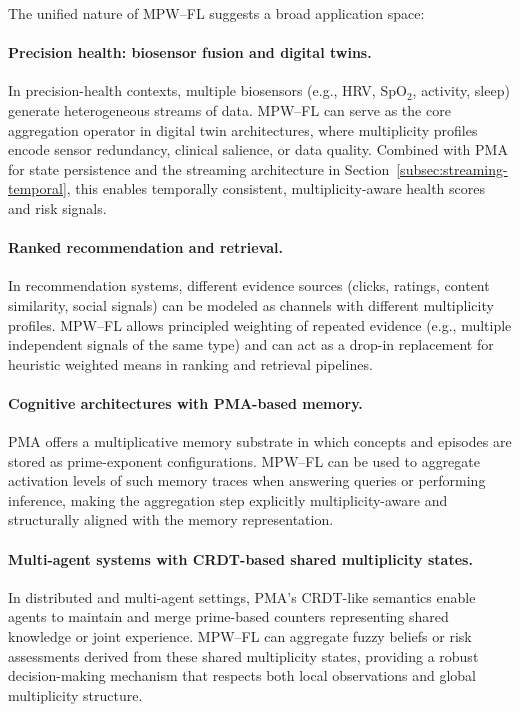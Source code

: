 \documentclass[11pt]{article}
\begin{document}
The unified nature of MPW--FL suggests a broad application space:

\paragraph{Precision health: biosensor fusion and digital twins.}
In precision-health contexts, multiple biosensors (e.g., HRV, SpO$_2$, activity, sleep) generate heterogeneous streams of data. MPW--FL can serve as the core aggregation operator in digital twin architectures, where multiplicity profiles encode sensor redundancy, clinical salience, or data quality. Combined with PMA for state persistence and the streaming architecture in Section~\ref{subsec:streaming-temporal}, this enables temporally consistent, multiplicity-aware health scores and risk signals.

\paragraph{Ranked recommendation and retrieval.}
In recommendation systems, different evidence sources (clicks, ratings, content similarity, social signals) can be modeled as channels with different multiplicity profiles. MPW--FL allows principled weighting of repeated evidence (e.g., multiple independent signals of the same type) and can act as a drop-in replacement for heuristic weighted means in ranking and retrieval pipelines.

\paragraph{Cognitive architectures with PMA-based memory.}
PMA offers a multiplicative memory substrate in which concepts and episodes are stored as prime-exponent configurations. MPW--FL can be used to aggregate activation levels of such memory traces when answering queries or performing inference, making the aggregation step explicitly multiplicity-aware and structurally aligned with the memory representation.

\paragraph{Multi-agent systems with CRDT-based shared multiplicity states.}
In distributed and multi-agent settings, PMA’s CRDT-like semantics enable agents to maintain and merge prime-based counters representing shared knowledge or joint experience. MPW--FL can aggregate fuzzy beliefs or risk assessments derived from these shared multiplicity states, providing a robust decision-making mechanism that respects both local observations and global multiplicity structure.
\end{document}
